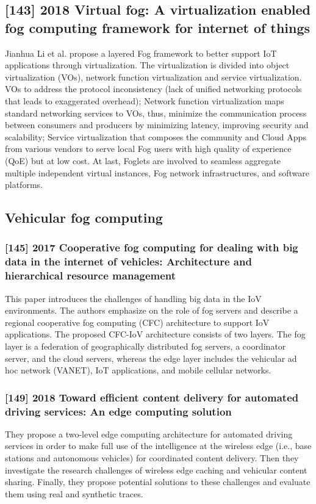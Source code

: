 \subsection{[143] 2018 Virtual fog: A virtualization enabled fog computing framework for internet of things}
\label{subsec:paper04}
Jianhua Li et al. \cite{li2018virtual} propose a layered Fog framework to better support IoT applications through virtualization. The virtualization is divided into object virtualization (VOs), network function virtualization and service virtualization. VOs to address the protocol inconsistency (lack of unified networking protocols that leads to exaggerated overhead); Network function virtualization maps standard networking services to VOs, thus, minimize the communication process between consumers and producers by minimizing latency, improving security and scalability; Service virtualization that composes the community and Cloud Apps from various vendors to serve local Fog users with high quality of experience (QoE) but at low cost. At last, Foglets are involved to seamless aggregate multiple independent virtual instances, Fog network infrastructures, and software platforms.

\subsection{Vehicular fog computing}
\subsubsection{[145] 2017 Cooperative fog computing for dealing with big data in the internet of vehicles: Architecture and hierarchical resource management}
This paper introduces the challenges of handling big data in the IoV environments. The authors emphasize on the role of fog servers and describe a regional cooperative fog computing (CFC) architecture to support IoV applications. The proposed CFC-IoV architecture consists of two layers. The fog layer is a federation of geographically distributed fog servers, a coordinator server, and the cloud servers, whereas the edge layer includes the vehicular ad hoc network (VANET), IoT applications, and mobile cellular networks.

\subsubsection{[149] 2018 Toward efficient content delivery for automated driving services: An edge computing solution}
They propose a two-level edge computing architecture for automated driving services in order to make full use of the intelligence at the wireless edge (i.e., base stations and autonomous vehicles) for coordinated content delivery. Then they investigate the research challenges of wireless edge caching and vehicular content sharing. Finally, they propose potential solutions to these challenges and evaluate them using real and synthetic traces.

